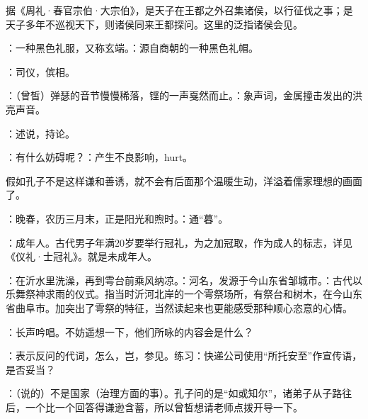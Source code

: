 {据《周礼·春官宗伯·大宗伯》，是天子在王都之外召集诸侯，以行征伐之事；是天子多年不巡视天下，则诸侯同来王都探问。这里的泛指诸侯会见。

：一种黑色礼服，又称玄端。：源自商朝的一种黑色礼帽。

\item {}：司仪，傧相。
\item {}：（曾皙）弹瑟的音节慢慢稀落，铿的一声戛然而止。：象声词，金属撞击发出的洪亮声音。
\item {}：述说，持论。%
\item {}：有什么妨碍呢？：产生不良影响，hurt。

假如孔子不是这样谦和善诱，就不会有后面那个温暖生动，洋溢着儒家理想的画面了。

\item {}：晚春，农历三月末，正是阳光和煦时。：通“暮”。

\item {}：成年人。古代男子年满20岁要举行冠礼，为之加冠取，作为成人的标志，详见《仪礼·士冠礼》。就是未成年人。

\item {}：在沂水里洗澡，再到雩台前乘风纳凉。：河名，发源于今山东省邹城市。：古代以乐舞祭神求雨的仪式。指当时沂河北岸的一个雩祭场所，有祭台和树木，在今山东省曲阜市。加突出了雩祭的特征，当然读起来也更能感受那种顺心恣意的心情。%

\item {}：长声吟唱。不妨遥想一下，他们所咏的内容会是什么？

\item {}：表示反问的代词，怎么，岂，参见。练习：快递公司使用“所托安至”作宣传语，是否妥当？

\item {}：（说的）不是国家（治理方面的事）。孔子问的是“如或知尔”，诸弟子从子路往后，一个比一个回答得谦逊含蓄，所以曾皙想请老师点拨开导一下。
}
{}



